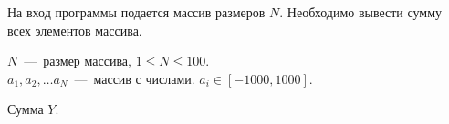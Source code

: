 На вход программы подается массив размеров $N$. Необходимо вывести сумму всех элементов массива.

\InputFile

\noindent
$N$~---~размер массива, $1 \leq N \leq 100$. \\
$a_1, a_2, \ldots a_N$~---~массив с числами. $ a_i \in [-1000, 1000]$. 

\OutputFile

Сумма $Y$.

\SAMPLES

